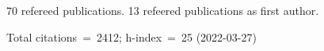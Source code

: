 70 refereed publications. 13 refeered publications as first author.

Total citations~=~2412; h-index~=~25 (2022-03-27)